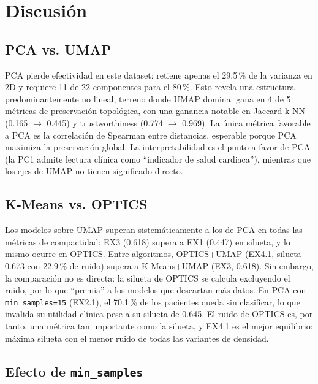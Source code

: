 \documentclass[11pt,a4paper]{article}
\begin{document}
\section{Discusión}\label{sec:discusion}

\subsection{PCA vs. UMAP}

PCA pierde efectividad en este dataset: retiene apenas el 29.5\,\% de la varianza en 2D y
requiere 11 de 22 componentes para el 80\,\%. Esto revela una estructura predominantemente no
lineal, terreno donde UMAP domina: gana en 4 de 5 métricas de preservación topológica, con
una ganancia notable en Jaccard k-NN (0.165 $\rightarrow$ 0.445) y trustworthiness
(0.774 $\rightarrow$ 0.969). La única métrica favorable a PCA es la correlación de Spearman
entre distancias, esperable porque PCA maximiza la preservación global. La interpretabilidad
es el punto a favor de PCA (la PC1 admite lectura clínica como ``indicador de salud
cardiaca''), mientras que los ejes de UMAP no tienen significado directo.

\subsection{K-Means vs. OPTICS}

Los modelos sobre UMAP superan sistemáticamente a los de PCA en todas las métricas de
compactidad: EX3 (0.618) supera a EX1 (0.447) en silueta, y lo mismo ocurre en OPTICS. Entre
algoritmos, OPTICS+UMAP (EX4.1, silueta 0.673 con 22.9\,\% de ruido) supera a K-Means+UMAP
(EX3, 0.618). Sin embargo, la comparación no es directa: la silueta de OPTICS se calcula
excluyendo el ruido, por lo que ``premia'' a los modelos que descartan más datos. En PCA con
\texttt{min\_samples=15} (EX2.1), el 70.1\,\% de los pacientes queda sin clasificar, lo que
invalida su utilidad clínica pese a su silueta de 0.645. El ruido de OPTICS es, por tanto, una
métrica tan importante como la silueta, y EX4.1 es el mejor equilibrio: máxima silueta con el
menor ruido de todas las variantes de densidad.

\subsection{Efecto de \texttt{min\_samples}}
\end{document}

